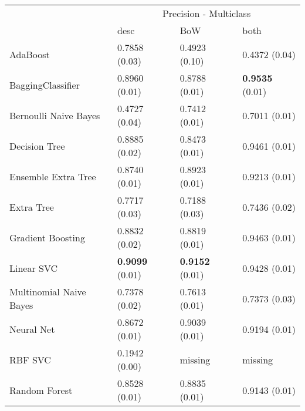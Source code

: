 \begin{tabular}{|l|l|l|l| }
\hline
 &  \multicolumn{3}{c|}{ Precision - Multiclass} \\
\cline{2-4} & desc & BoW & both \\ \hline
AdaBoost                & 0.7858 (0.03) & 0.4923 (0.10) & 0.4372 (0.04)\\
BaggingClassifier       & 0.8960 (0.01) & 0.8788 (0.01) & {\bf 0.9535} (0.01)\\
Bernoulli Naive Bayes   & 0.4727 (0.04) & 0.7412 (0.01) & 0.7011 (0.01)\\
Decision Tree           & 0.8885 (0.02) & 0.8473 (0.01) & 0.9461 (0.01)\\
Ensemble Extra Tree     & 0.8740 (0.01) & 0.8923 (0.01) & 0.9213 (0.01)\\
Extra Tree              & 0.7717 (0.03) & 0.7188 (0.03) & 0.7436 (0.02)\\
Gradient Boosting       & 0.8832 (0.02) & 0.8819 (0.01) & 0.9463 (0.01)\\
Linear SVC              & {\bf 0.9099} (0.01) & {\bf 0.9152} (0.01) & 0.9428 (0.01)\\
Multinomial Naive Bayes & 0.7378 (0.02) & 0.7613 (0.01) & 0.7373 (0.03)\\
Neural Net              & 0.8672 (0.01) & 0.9039 (0.01) & 0.9194 (0.01)\\
RBF SVC                 & 0.1942 (0.00) & missing  & missing \\
Random Forest           & 0.8528 (0.01) & 0.8835 (0.01) & 0.9143 (0.01)\\
\hline
\end{tabular}